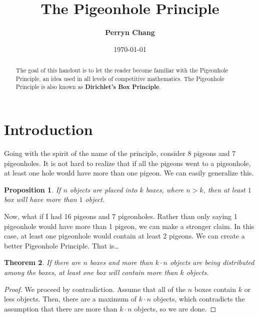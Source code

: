\documentclass[l1pt]{article}
\title{\textbf{The Pigeonhole Principle}}
\author{\textbf{Perryn Chang}}
\date{\today}
\theoremstyle{plain}
\newtheorem{thm}{Theorem}[section]
\newtheorem{prop}[thm]{Proposition}
\theoremstyle{definition}
\theoremstyle{remark}
\begin{document}
\maketitle

\begin{abstract}
The goal of this handout is to let the reader become familiar with the Pigeonhole Principle, an idea used in all levels of competitive mathematics. The Pigeonhole Principle is also known as \textbf{Dirichlet's Box Principle}.
\end{abstract}

\tableofcontents

\eject

\section{Introduction}
Going with the spirit of the name of the principle, consider $8$ pigeons and $7$ pigeonholes. It is not hard to realize that if all the pigeons went to a pigeonhole, at least one hole would have more than one pigeon. We can easily generalize this.

\begin{mdframed}
    \begin{prop}
    \label{prop:beginintro}
    If $n$ objects are placed into $k$ boxes, where $n>k$, then at least $1$ box will have more than $1$ object.
    \end{prop}
\end{mdframed}

Now, what if I had 16 pigeons and 7 pigeonholes. Rather than only saying 1 pigeonhole would have more than 1 pigeon, we can make a stronger claim. In this case, at least one pigeonhole would contain at least 2 pigeons. We can create a better Pigeonhole Principle. That is\dots 


\begin{mdframed}
\begin{thm}
If there are $n$ boxes and more than $k\cdot n$ objects are being distributed among the boxes, at least one box will contain more than $k$ objects.
\end{thm}
\end{mdframed}

\begin{proof}
We proceed by contradiction. Assume that all of the $n$ boxes contain $k$ or less objects. Then, there are a maximum of $k\cdot n$ objects, which contradicts the assumption that there are more than $k\cdot n$ objects, so we are done.
\end{proof}
\end{document}
